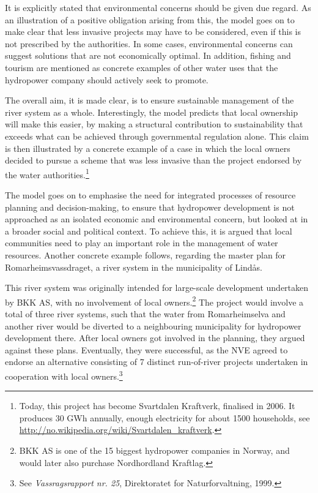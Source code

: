 It is explicitly stated that environmental concerns should be given due regard. As an illustration of a positive obligation arising from this, the model goes on to make clear that less invasive projects may have to be considered, even if this is not prescribed by the authorities. In some cases, environmental concerns can suggest solutions that are not economically optimal. In addition, fishing and tourism are mentioned as concrete examples of other water uses that the hydropower company should actively seek to promote.

The overall aim, it is made clear, is to ensure sustainable management of the river system as a whole. Interestingly, the model predicts that local ownership will make this easier, by making a structural  contribution to sustainability that exceeds what can be achieved through governmental regulation alone. This claim is then illustrated by a concrete example of a case in which the local owners decided to pursue a scheme that was less invasive than the project endorsed by the water authorities.\footnote{Today, this project has become Svartdalen Kraftverk, finalised in 2006. It produces 30 GWh annually, enough electricity for about 1500 households, see \url{http://no.wikipedia.org/wiki/Svartdalen_kraftverk}.}

The model goes on to emphasise the need for integrated processes of resource planning and decision-making, to ensure that hydropower development is not approached as an isolated economic and environmental concern, but looked at in a broader social and political context. To achieve this, it is argued that local communities need to play an important role in the management of water resources. Another concrete example follows, regarding the master plan for Romarheimsvassdraget, a river system in the municipality of Lindås. 

This river system was originally intended for large-scale development undertaken by BKK AS, with no involvement of local owners.\footnote{BKK AS is one of the 15 biggest hydropower companies in Norway, and would later also purchase Nordhordland Kraftlag.} The project would involve a total of three river systems, such that the water from Romarheimselva and another river would be diverted to a neighbouring municipality for hydropower development there. After local owners got involved in the planning, they argued against these plans. Eventually, they were successful, as the NVE agreed to endorse an alternative consisting of 7 distinct run-of-river projects undertaken in cooperation with local owners.\footnote{See {\it Vassragsrapport nr. 25}, Direktoratet for Naturforvaltning, 1999.}

